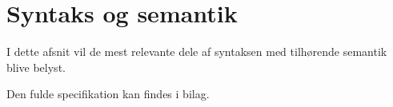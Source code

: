 \section{Syntaks og semantik}\label{sec:Syntax}
I dette afsnit vil de mest relevante dele af syntaksen med tilhørende semantik blive belyst. 

Den fulde specifikation kan findes i bilag. 





